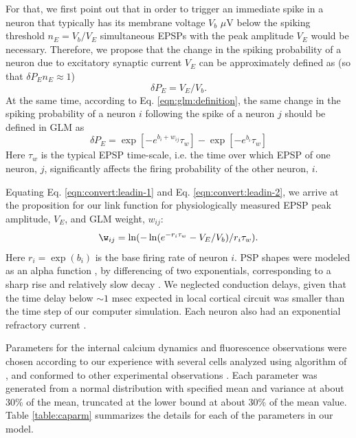 For that, we first point out that in order to trigger an immediate spike in a neuron that typically has its membrane voltage $V_b$ $\mu$V below the spiking threshold $n_E = V_b / V_E$ simultaneous EPSPs with the peak amplitude $V_E$ would be necessary.
Therefore, we propose that the change in the spiking probability of a neuron due to excitatory synaptic current $V_E$ can be approximately defined as
(so that $\delta P_E n_E \approx 1$)
\begin{equation}\label{eqn:convert:leadin-1}
\delta P_E = V_E/V_b.
\end{equation}
At the same time, according to Eq. \ref{eqn:glm:definition}, the same change in the spiking probability of a neuron $i$ following the spike of a neuron $j$ should be defined in GLM as
\begin{equation}\label{eqn:convert:leadin-2}
\delta P_E = \exp[-e^{b_i+w_{ij}}\tau_w]-\exp[-e^{b_i}\tau_w]
\end{equation}
Here $\tau_w$ is the typical EPSP time-scale, i.e. the time over which EPSP of one neuron, $j$, significantly affects the firing probability of the other neuron, $i$.

Equating Eq. \ref{eqn:convert:leadin-1} and Eq. \ref{eqn:convert:leadin-2}, we arrive at the proposition for our link function for physiologically measured EPSP peak amplitude, $V_E$, and GLM weight, $w_{ij}$:
\begin{equation}\label{eqn:convert}
\w_{ij}=\ln(-\ln(e^{-r_i\tau_w}-V_E/V_b)/r_i\tau_w).
\end{equation}
Here $r_i=\exp(b_i)$ is the base firing rate of neuron $i$. PSP shapes were modeled as an alpha function \cite{Koch99}, by differencing of two exponentials, corresponding to a sharp rise and relatively slow decay \cite{Sayer1990}.
We neglected conduction delays, given that the time delay below $\sim 1$ msec expected in local cortical circuit was smaller than the time step of our computer simulation.  Each neuron also had an exponential refractory current \cite{Koch99}.

Parameters for the internal calcium dynamics and fluorescence observations were chosen according to our experience with several cells analyzed using algorithm of \cite{Vogelstein2009}, and conformed to other experimental observations \cite{ImagingManual,HelmchenSakmann96,BrenowitzRegehr07}. Each parameter was generated from a normal distribution with specified mean and variance at about 30\% of the mean, truncated at the lower bound at about 30\% of the mean value.  Table \ref{table:caparm} summarizes the details for each of the parameters in our model.


